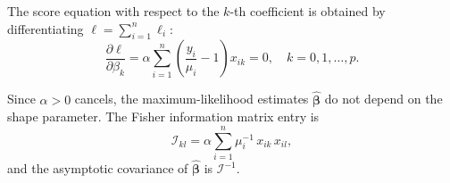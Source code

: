 The score equation with respect to the $k$-th coefficient is obtained by differentiating $\ell = \sum_{i=1}^{n} \ell_i$:
\begin{equation}
  \frac{\partial \ell}{\partial \beta_k} = \alpha \sum_{i=1}^{n} \left( \frac{y_i}{\mu_i} - 1 \right) x_{ik} = 0, \quad k = 0, 1, \ldots, p.
  \label{eq:glm_score_annex}
\end{equation}

Since $\alpha > 0$ cancels, the maximum-likelihood estimates $\hat{\boldsymbol{\beta}}$ do not depend on the shape parameter. The Fisher information matrix entry is
\[
  \mathcal{I}_{kl} = \alpha \sum_{i=1}^{n} \mu_i^{-1} \, x_{ik} \, x_{il},
\]
and the asymptotic covariance of $\hat{\boldsymbol{\beta}}$ is $\mathcal{I}^{-1}$.
